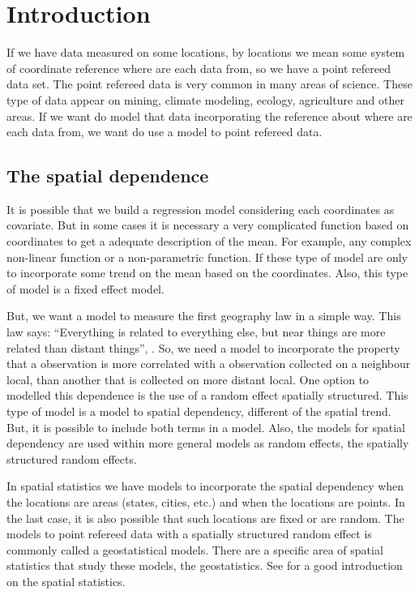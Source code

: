 
\chapter{Introduction} 

If we have data measured on some locations, 
by locations we mean some system of coordinate 
reference where are each data from, so we 
have a point refereed data set. 
The point refereed data is very common in many 
areas of science. These type of data appear on 
mining, climate modeling, ecology, agriculture 
and other areas. 
If we want do model that data incorporating 
the reference about where are each data from, 
we want do use a model to point refereed data. 

\section{The spatial dependence}

It is possible that we build a regression model 
considering each coordinates as covariate. 
But in some cases it is necessary a very 
complicated function based on coordinates to 
get a adequate description of the mean. 
For example, any complex non-linear function or 
a non-parametric function. 
If these type of model are only to incorporate 
some trend on the mean based on the coordinates. 
Also, this type of model is a fixed effect model. 

But, we want a model to measure the first geography 
law in a simple way. 
This law says: ``Everything is related to everything else, 
but near things are more related than distant things'', 
\cite{tobler:1970}. 
So, we need a model to incorporate the property that a 
observation is more correlated with a observation 
collected on a neighbour local, than another that 
is collected on more distant local. 
One option to modelled this dependence is the use 
of a random effect spatially structured. 
This type of model is a model to spatial dependency, 
different of the spatial trend. 
But, it is possible to include both terms in a model. 
Also, the models for spatial dependency are used 
within more general models as random effects, 
the spatially structured random effects. 

In spatial statistics we have models to incorporate the 
spatial dependency when the locations are areas 
(states, cities, etc.) and when the locations are points. 
In the last case, it is also possible that such 
locations are fixed or are random. 
The models to point refereed data with a spatially 
structured random effect is commonly called a 
geostatistical models. 
There are a specific area of spatial statistics 
that study these models, the geostatistics. 
See \cite{cressie:1993} for a good introduction on 
the spatial statistics. 


